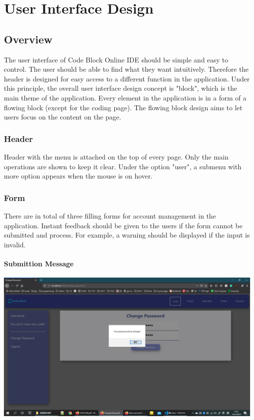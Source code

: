 \chapter{User Interface Design}
\section{Overview}
The user interface of Code Block Online IDE should be simple and easy to control. The user should be able to find what they want intuitively. Therefore the header is designed for easy access to a different function in the application. Under this principle, the overall user interface design concept is "block", which is the main theme of the application. Every element in the application is in a form of a flowing block (except for the coding page). The flowing block design aims to let users focus on the content on the page.

\subsection{Header}
Header with the menu is attached on the top of every page. Only the main operations are shown to keep it clear. Under the option "user", a submenu with more option appears when the mouse is on hover.

\subsection{Form}
There are in total of three filling forms for account management in the application. Instant feedback should be given to the users if the form cannot be submitted and process. For example, a warning should be displayed if the input is invalid.
\subsubsection{Submittion Message}
\includegraphics[scale=0.45]{Doc/Pics/change_pw_sign.png}


